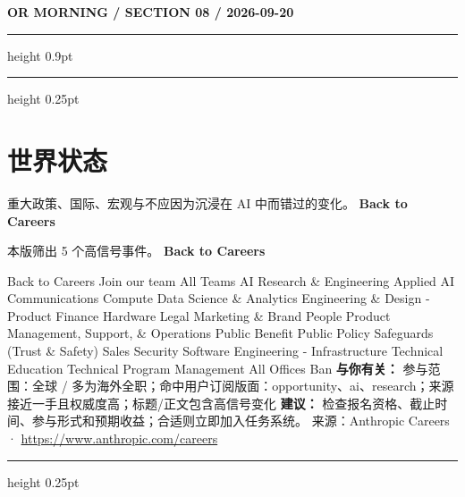 \documentclass[10.5pt]{ctexart}
\begin{document}
\newpage
{\small\bfseries OR MORNING / SECTION 08 / 2026-09-20}
\vspace{2mm}
\hrule height 0.9pt
\vspace{1.5mm}
\hrule height 0.25pt
\vspace{4mm}
\section*{世界状态}
{\color{ormuted} 重大政策、国际、宏观与不应因为沉浸在 AI 中而错过的变化。}
\vspace{2mm}
{\LARGE\bfseries Back to Careers}\par
\vspace{1mm}
{\color{ormuted} 本版筛出 5 个高信号事件。}
\vspace{3mm}
{\Large\bfseries Back to Careers}\par
Back to Careers Join our team All Teams AI Research \& Engineering Applied AI Communications Compute Data Science \& Analytics Engineering \& Design - Product Finance Hardware Legal Marketing \& Brand People Product Management, Support, \& Operations Public Benefit Public Policy Safeguards (Trust \& Safety) Sales Security Software Engineering - Infrastructure Technical Education Technical Program Management All Offices Ban
\textbf{与你有关：} 参与范围：全球 / 多为海外全职；命中用户订阅版面：opportunity、ai、research；来源接近一手且权威度高；标题/正文包含高信号变化
\textbf{建议：} 检查报名资格、截止时间、参与形式和预期收益；合适则立即加入任务系统。
{\footnotesize\color{ormuted} 来源：Anthropic Careers · \url{https://www.anthropic.com/careers}}
\vspace{4mm}
\hrule height 0.25pt
\vspace{3mm}
\end{document}
